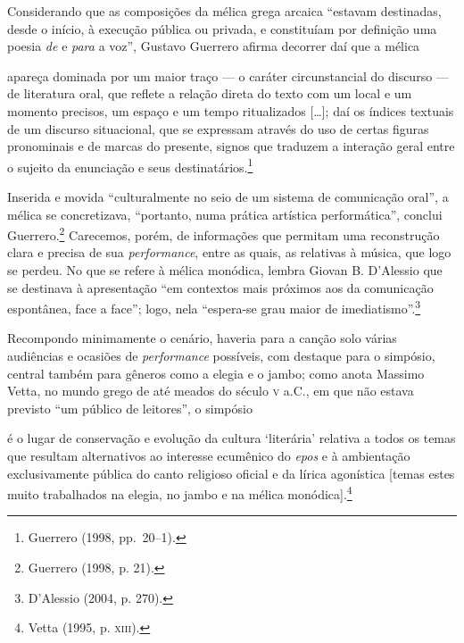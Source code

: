 Considerando que as composições da mélica grega arcaica “estavam destinadas,
desde o início, à execução pública ou privada, e constituíam por definição uma
poesia \textit{de} e \textit{para} a voz”, Gustavo Guerrero
afirma decorrer daí que a mélica

\begin{hedraquote}
apareça dominada por um maior traço --- o caráter circunstancial do discurso --- de
literatura oral, que reflete a relação direta do texto com um local e um
momento precisos, um espaço e um tempo ritualizados [\ldots{}]; daí os índices
textuais de um discurso situacional, que se expressam através do uso de certas
figuras pronominais e de marcas do presente, signos que traduzem a interação
geral entre o sujeito da enunciação e seus destinatários.\footnote{ Guerrero (1998, pp.~20--1).}
\end{hedraquote}

Inserida e movida “culturalmente no seio de um sistema de comunicação oral”, a
mélica se concretizava, “portanto, numa prática artística performática”,
conclui Guerrero.\footnote{ Guerrero (1998, p. 21).} Carecemos, porém, de informações que permitam uma
reconstrução clara e precisa de sua \textit{performance}, entre as quais, as
relativas à música, que logo se perdeu. No que se refere à mélica monódica,
lembra Giovan B. D’Alessio que se destinava à apresentação “em
contextos mais próximos aos da comunicação espontânea, face a face”; logo, nela
“espera-se grau maior de imediatismo”.\footnote{ D’Alessio (2004, p. 270).} 

Recompondo minimamente o cenário, haveria para a canção solo várias audiências e
ocasiões de \textit{performance} possíveis, com destaque para o simpósio,
central também para gêneros como a elegia e o jambo; como anota Massimo Vetta,
no mundo grego de até meados do século \textsc{v} a.C., em que não
estava previsto “um público de leitores”, o simpósio 

\begin{hedraquote}
é o lugar de conservação
e evolução da cultura ‘literária’ relativa a todos os temas que resultam
alternativos ao interesse ecumênico do \textit{epos} e à ambientação
exclusivamente pública do canto religioso oficial e da lírica agonística
[temas estes muito trabalhados na elegia, no jambo e na mélica monódica].\footnote{ Vetta (1995, p. \textsc{xiii}).}
\end{hedraquote}

